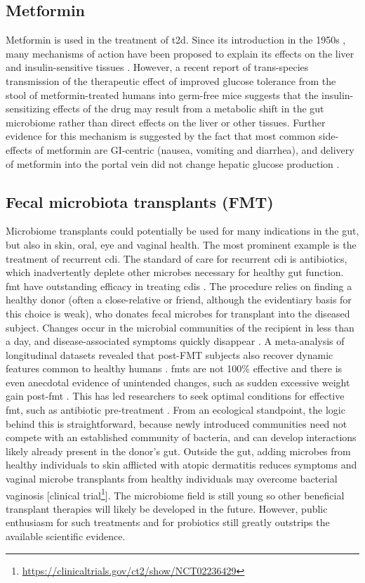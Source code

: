 \subsection{Metformin}
Metformin is used in the treatment of \gls{t2d}. Since its introduction in the 1950s \cite{RN4103}, many mechanisms of action have been proposed to explain its effects on the liver and insulin-sensitive tissues \cite{RN4126}. However, a recent report of trans-species transmission of the therapeutic effect of improved glucose tolerance from the stool of metformin-treated humans into germ-free mice \cite{RN4127} suggests that the insulin-sensitizing effects of the drug may result from a metabolic shift in the gut microbiome rather than direct effects on the liver or other tissues. Further evidence for this mechanism is suggested by the fact that most common side-effects of metformin are GI-centric (nausea, vomiting and diarrhea), and delivery of metformin into the portal vein did not change hepatic glucose production \cite{RN4128}.

\subsection{Fecal microbiota transplants (FMT)}
Microbiome transplants could potentially be used for many indications in the gut, but also in skin, oral, eye and vaginal health. The most prominent example is the treatment of recurrent \gls{cdi}. The standard of care for recurrent \gls{cdi} is antibiotics, which inadvertently deplete other microbes necessary for healthy gut function. \Gls{fmt} have outstanding efficacy in treating \glspl{cdi} \cite{RN4129}. The procedure relies on finding a healthy donor (often a close-relative or friend, although the evidentiary basis for this choice is weak), who donates fecal microbes for transplant into the diseased subject. Changes occur in the microbial communities of the recipient in less than a day, and disease-associated symptoms quickly disappear \cite{RN4130}. A meta-analysis of longitudinal datasets revealed that post-FMT subjects also recover dynamic features common to healthy humans \cite{RN4131}. \Glspl{fmt} are not 100\% effective and there is even anecdotal evidence of unintended changes, such as sudden excessive weight gain post-\gls{fmt} \cite{RN4132}. This has led researchers to seek optimal conditions for effective \gls{fmt}, such as antibiotic pre-treatment \cite{RN4134, RN4133}. From an ecological standpoint, the logic behind this is straightforward, because newly introduced communities need not compete with an established community of bacteria, and can develop interactions likely already present in the donor's gut. Outside the gut, adding microbes from healthy individuals to skin afflicted with atopic dermatitis reduces symptoms \cite{RN4135} and vaginal microbe transplants from healthy individuals may overcome bacterial vaginosis [clinical trial\footnote{\url{https://clinicaltrials.gov/ct2/show/NCT02236429}}]. The microbiome field is still young so other beneficial transplant therapies will likely be developed in the future. However, public enthusiasm for such treatments and for probiotics still greatly outstrips the available scientific evidence.


